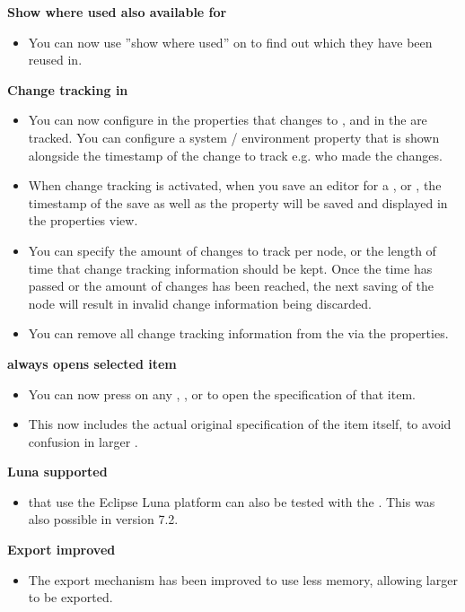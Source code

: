 \textbf{Show where used also available for \gdsuites{}}
\begin{itemize}
\item You can now use ''show where used'' on \gdsuites{} to find out which \gdjobs{} they have been reused in.
\end{itemize}

\textbf{Change tracking in \gdprojects{}}
\begin{itemize}
\item You can now configure in the \gdproject{} properties that changes to \gdcases{}, \gdsuites{} and \gdjobs{} in the \gdproject{} are tracked. You can configure a system / environment property that is shown alongside the timestamp of the change to track e.g. who made the changes. 
\item When change tracking is activated, when you save an editor for a \gdcase{}, \gdsuite{} or \gdjob{}, the timestamp of the save as well as the property will be saved and displayed in the properties view.
\item You can specify the amount of changes to track per node, or the length of time that change tracking information should be kept. Once the time has passed or the amount of changes has been reached, the next saving of the node will result in invalid change information being discarded.
\item You can remove all change tracking information from the \gdproject{} via the \gdproject{} properties. 
\end{itemize}

\textbf{ always opens selected item}
\begin{itemize}
\item You can now press  on any \gdcase{}, \gdsuite{}, or \gdjob{} to open the specification of that item.
\item This now includes the actual original specification of the item itself, to avoid confusion in larger \gdprojects{}. 
\end{itemize}

\textbf{Luna \gdauts{} supported}
\begin{itemize}
\item \gdauts{} that use the Eclipse Luna platform can also be tested with the \ite{}. This was also possible in version 7.2.
\end{itemize}

\textbf{Export improved}
\begin{itemize}
\item The export mechanism has been improved to use less memory, allowing larger \gdprojects{} to be exported.
\end{itemize}


